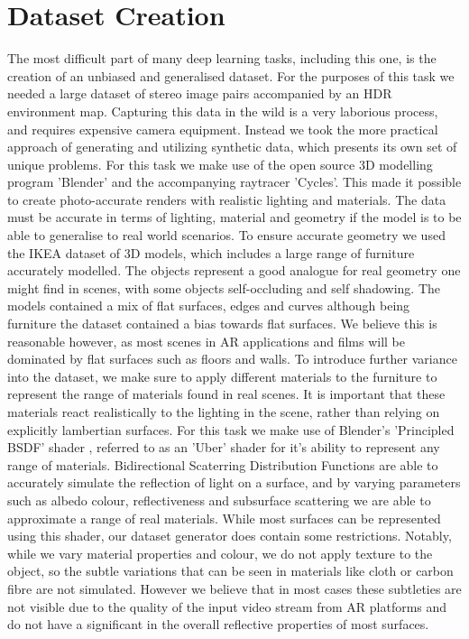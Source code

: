 \documentclass[ %
                    author={Gavin Parker},
                supervisor={Dr. Neill Campbell},
                    degree={MEng},
                     title={Deep Siamese Networks for Illumination Estimation from Stereo Images},
                  subtitle={},
                      type={research},
                      year={2018} ]{dissertation}
\begin{document}
\section{Dataset Creation}
The most difficult part of many deep learning tasks, including this one, is the creation of an unbiased and generalised dataset. For the purposes of this task we needed a large dataset of stereo image pairs accompanied by an HDR environment map. Capturing this data in the wild is a very laborious process, and requires expensive camera equipment. Instead we took the more practical approach of generating and utilizing synthetic data, which presents its own set of unique problems. For this task we make use of the open source 3D modelling program 'Blender' and the accompanying raytracer 'Cycles'. This made it possible to create photo-accurate renders with realistic lighting and materials. The data must be accurate in terms of lighting, material and geometry if the model is to be able to generalise to real world scenarios. To ensure accurate geometry we used the IKEA dataset \cite{lpt2013ikea} of 3D models, which includes a large range of furniture accurately modelled. The objects represent a good analogue for real geometry one might find in scenes, with some objects self-occluding and self shadowing. The models contained a mix of flat surfaces, edges and curves although being furniture the dataset contained a bias towards flat surfaces. We believe this is reasonable however, as most scenes in AR applications and films will be dominated by flat surfaces such as floors and walls.
\newline
To introduce further variance into the dataset, we make sure to apply different materials to the furniture to represent the range of materials found in real scenes. It is important that these materials react realistically to the lighting in the scene, rather than relying on explicitly lambertian surfaces. For this task we make use of Blender's 'Principled BSDF' shader \cite{principled_BSDF}, referred to as an 'Uber' shader for it's ability to represent any range of materials. Bidirectional Scaterring Distribution Functions are able to accurately simulate the reflection of light on a surface, and by varying parameters such as albedo colour, reflectiveness and subsurface scattering we are able to approximate a range of real materials. While most surfaces can be represented using this shader, our dataset generator does contain some restrictions. Notably, while we vary material properties and colour, we do not apply texture to the object, so the subtle variations that can be seen in materials like cloth or carbon fibre are not simulated. However we believe that in most cases these subtleties are not visible due to the quality of the input video stream from AR platforms and do not have a significant in the overall reflective properties of most surfaces.
\end{document}
